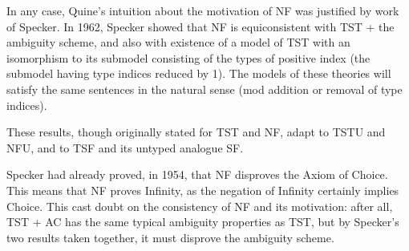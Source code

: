 \documentclass{slides}
\begin{document}
\begin{slide}

In any case, Quine's intuition about the motivation of NF was justified by work of Specker.  In 1962, Specker showed that
NF is equiconsistent with TST + the ambiguity scheme, and also with existence of a model of TST with an isomorphism to its submodel consisting of the types of positive index (the submodel having type indices reduced by 1).  The models of these theories will satisfy the same sentences in the natural sense (mod addition or removal of type indices).

These results, though originally stated for TST and NF, adapt to TSTU and NFU, and to TSF and its untyped analogue SF.

Specker had already proved, in 1954, that NF disproves the Axiom of Choice.  This means that NF proves Infinity, as the negation of Infinity certainly implies Choice.  This cast doubt on the consistency of NF and its motivation: after all, TST + AC has the same typical ambiguity properties as TST, but by Specker's two results taken together, it must disprove the ambiguity scheme.

\end{slide}
\end{document}
